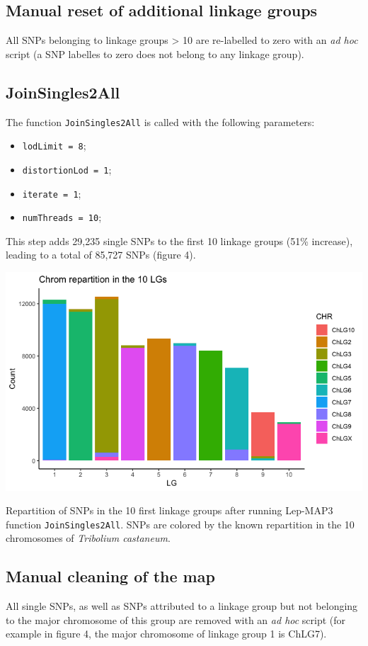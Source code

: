 \documentclass[english, a4paper, 12pt]{article}
\makeatletter
\newenvironment{figurehere}
{\def\@captype{figure}}
{}
\makeatother
\begin{document}
\subsection{Manual reset of additional linkage groups}
All SNPs belonging to linkage groups > 10 are re-labelled to zero with an \textit{ad hoc} script (a SNP labelles to zero does not belong to any linkage group).

\subsection{JoinSingles2All}

The function \texttt{JoinSingles2All} is called with the following parameters:
\begin{itemize}
\item \texttt{lodLimit = 8};
\item \texttt{distortionLod = 1};
\item \texttt{iterate = 1};
\item \texttt{numThreads = 10};
\end{itemize}

This step adds 29,235 single SNPs to the first 10 linkage groups (51\% increase), leading to a total of 85,727 SNPs (figure 4).

\hfill

\begin{figurehere}
\centering
\includegraphics[width=0.5\linewidth]{figure4.png}
\caption{\small{Repartition of SNPs in the 10 first linkage groups after running Lep-MAP3 function \texttt{JoinSingles2All}. SNPs are colored by the known repartition in the 10 chromosomes of \textit{Tribolium castaneum}.}}
\end{figurehere}

\subsection{Manual cleaning of the map}

All single SNPs, as well as SNPs attributed to a linkage group but not belonging to the major chromosome of this group are removed with an \textit{ad hoc} script (for example in figure 4, the major chromosome of linkage group 1 is ChLG7).
\end{document}
